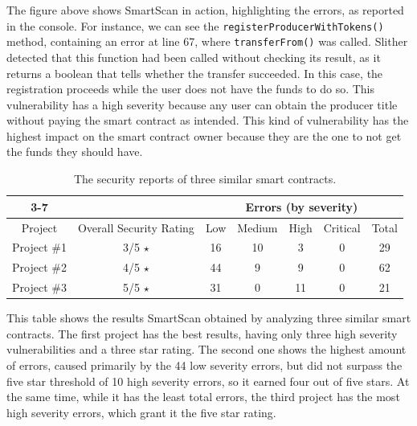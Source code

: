 The figure above shows SmartScan in action, highlighting the errors, as reported in the console. For instance, we can see the \texttt{registerProducerWithTokens()} method, containing an error at line 67, where \texttt{transferFrom()}\cite{solidityDocs} was called. Slither detected that this function had been called without checking its result, as it returns a boolean that tells whether the transfer succeeded. In this case, the registration proceeds while the user does not have the funds to do so. This vulnerability has a high severity because any user can obtain the producer title without paying the smart contract as intended. This kind of vulnerability has the highest impact on the smart contract owner because they are the one to not get the funds they should have.

\begin{table}[h]
\begin{tabular}{cc|ccccc|}
\cline{3-7}
                                  &                                               & \multicolumn{5}{c|}{Errors (by severity)}                                                                                  \\ \hline
\multicolumn{1}{|c|}{Project}     & Overall Security Rating                       & \multicolumn{1}{c|}{Low} & \multicolumn{1}{c|}{Medium} & \multicolumn{1}{c|}{High} & \multicolumn{1}{c|}{Critical} & Total \\ \hline
\multicolumn{1}{|c|}{Project \#1 \cite{sampleProject1}} & 3/5 $\star$             & \multicolumn{1}{c|}{16}  & \multicolumn{1}{c|}{10}     & \multicolumn{1}{c|}{3}    & \multicolumn{1}{c|}{0}        & 29    \\
\multicolumn{1}{|c|}{Project \#2 \cite{sampleProject2}} & 4/5 $\star$             & \multicolumn{1}{c|}{44}  & \multicolumn{1}{c|}{9}      & \multicolumn{1}{c|}{9}    & \multicolumn{1}{c|}{0}        & 62    \\
\multicolumn{1}{|c|}{Project \#3 \cite{sampleProject3}} & 5/5 $\star$             & \multicolumn{1}{c|}{31}  & \multicolumn{1}{c|}{0}      & \multicolumn{1}{c|}{11}   & \multicolumn{1}{c|}{0}        & 21    \\ \hline
\end{tabular}
\caption{The security reports of three similar smart contracts.}
\label{tab:my-table}
\end{table}
\newpage

This table shows the results SmartScan obtained by analyzing three similar smart contracts. The first project has the best results, having only three high severity vulnerabilities and a three star rating. The second one shows the highest amount of errors, caused primarily by the 44 low severity errors, but did not surpass the five star threshold of 10 high severity errors, so it earned four out of five stars. At the same time, while it has the least total errors, the third project has the most high severity errors, which grant it the five star rating.

